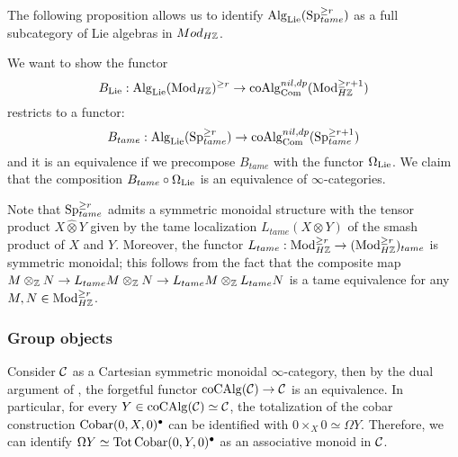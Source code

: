 






The following proposition allows us to identify $\operatorname{Alg}_{\operatorname{Lie}}(\operatorname{Sp}^{\geq r}_{tame})$ as a full subcategory of Lie algebras in $Mod_{H{\mathbb{Z}}}$.




We want to show the functor 
$$
B_{\operatorname{Lie}}: \operatorname{Alg}_{\operatorname{Lie}}(\operatorname{Mod}_{H{\mathbb{Z}}})^{\geq r} \to \operatorname{coAlg}^{nil, dp}_{\operatorname{Com}}(\operatorname{Mod}_{H{\mathbb{Z}}}^{\geq r+1})
$$ 
restricts to a functor:
$$
B_{tame}: \operatorname{Alg}_{\operatorname{Lie}}(\operatorname{Sp}^{\geq r}_{tame})\to \operatorname{coAlg}^{nil, dp}_{\operatorname{Com}}(\operatorname{Sp}^{\geq r+1}_{tame})
$$
and it is an equivalence if we precompose $B_{tame}$ with the functor $\Omega_{\operatorname{Lie}}$. We claim that the composition $B_{tame}\circ \Omega_{\operatorname{Lie}}$ is an equivalence of $\infty$-categories.

\begin{remark}
\label{symmetric monoidal structure on Mod_Z tame}
	Note that $\operatorname{Sp}^{\geq r}_{tame}$ admits a symmetric monoidal structure with the tensor product $X\hat{\otimes} Y$ given by the tame localization $L_{tame}(X\otimes Y)$ of the smash product of $X$ and $Y$. 
	Moreover, the functor $L_{tame}:\operatorname{Mod}_{H{\mathbb{Z}}}^{\geq r}\to (\operatorname{Mod}_{H{\mathbb{Z}}}^{\geq r})_{tame}$ is symmetric monoidal; this follows from the fact that the composite map $M \otimes_{{\mathbb{Z}}} N \to L_{tame}M\otimes_{{\mathbb{Z}}} N \to L_{tame}M\otimes_{{\mathbb{Z}}} L_{tame}N$ is a tame equivalence for any $M,N\in \operatorname{Mod}_{H{\mathbb{Z}}}^{\geq r}$.
\end{remark}

\subsubsection{Group objects}
Consider ${\mathcal{C}}$ as a Cartesian symmetric monoidal $\infty$-category, then by the dual argument of \cite[Proposition 2.4.3.9.]{HA}, the forgetful functor $\operatorname{coCAlg}({\mathcal{C}})\to {\mathcal{C}}$ is an equivalence.
In particular, for every $Y\in \operatorname{coCAlg}({\mathcal{C}})\simeq {\mathcal{C}}$, the totalization of the cobar construction $\operatorname{Cobar}(0,X,0)^{\bullet}$ can be identified with $0\times_X 0 \simeq \Omega Y$.
Therefore, we can identify $\Omega Y \simeq \operatorname{\operatorname{Tot}} \operatorname{Cobar}(0,Y,0)^{\bullet}$ as an associative monoid in ${\mathcal{C}}$.


